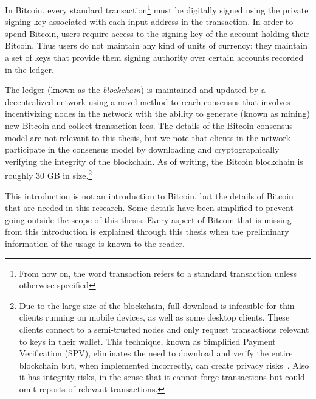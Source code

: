 In Bitcoin, every standard transaction\footnote{From now on, the word transaction refers to a standard transaction unless otherwise specified} must be digitally signed using the private signing key associated with each input address in the transaction. In order to spend Bitcoin, users require access to the signing key of the account holding their Bitcoin. Thus users do not maintain any kind of units of currency; they maintain a set of keys that provide them signing authority over certain accounts recorded in the ledger. 

The ledger (known as the \emph{blockchain}) is maintained and updated by a decentralized network using a novel method to reach consensus that involves incentivizing nodes in the network with the ability to generate (known as mining) new Bitcoin and collect transaction fees. The details of the Bitcoin consensus model are not relevant to this thesis, but we note that clients in the network participate in the consensus model by downloading and cryptographically verifying the integrity of the blockchain. As of writing, the Bitcoin blockchain is roughly 30 GB in size.\footnote{Due to the large size of the blockchain, full download is infeasible for thin clients running on mobile devices, as well as some desktop clients. These clients connect to a semi-trusted nodes and only request transactions relevant to keys in their wallet. This technique, known as Simplified Payment Verification (SPV), eliminates the need to download and verify the entire blockchain but, when implemented incorrectly, can create privacy risks~\cite{SPVbugs}. Also it has integrity risks, in the sense that it cannot forge transactions but could omit reports of relevant transactions.}

This introduction is not an introduction to Bitcoin, but the details of Bitcoin that are needed in this research. Some details have been simplified to prevent going outside the scope of this thesis. Every aspect of Bitcoin that is missing from this introduction is explained through this thesis when the preliminary information of the usage is known to the reader.


